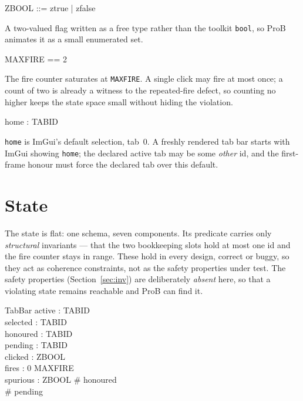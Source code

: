 \documentclass[a4paper,10pt,fleqn]{article}
\begin{document}
\begin{zed}
  ZBOOL ::= ztrue | zfalse
\end{zed}

A two-valued flag written as a free type rather than the toolkit
\texttt{bool}, so ProB animates it as a small enumerated set.

\begin{zed}
  MAXFIRE == 2
\end{zed}

The fire counter saturates at \texttt{MAXFIRE}.  A single click may fire at
most once; a count of two is already a witness to the repeated-fire defect, so
counting no higher keeps the state space small without hiding the violation.

\begin{axdef}
  home : TABID
\end{axdef}

\texttt{home} is ImGui's default selection, tab~0.  A freshly rendered tab bar
starts with ImGui showing \texttt{home}; the declared active tab may be some
\emph{other} id, and the first-frame honour must force the declared tab over
this default.

\section{State}

The state is flat: one schema, seven components.  Its predicate carries only
\emph{structural} invariants --- that the two bookkeeping slots hold at most
one id and the fire counter stays in range.  These hold in every design,
correct or buggy, so they act as coherence constraints, not as the safety
properties under test.  The safety properties (Section~\ref{sec:inv}) are
deliberately \emph{absent} here, so that a violating state remains reachable
and ProB can find it.

\begin{schema}{TabBar}
  active : TABID \\
  selected : TABID \\
  honoured : \power TABID \\
  pending : \power TABID \\
  clicked : ZBOOL \\
  fires : 0 \upto MAXFIRE \\
  spurious : ZBOOL
\where
  \# honoured  \\
  \# pending 
\end{schema}
\end{document}
